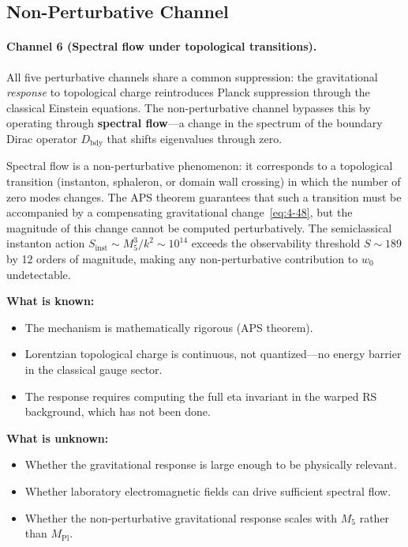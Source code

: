 \subsection{Non-Perturbative Channel}
\label{sec:4-nonperturbative}

\paragraph{Channel 6 (Spectral flow under topological transitions).}
All five perturbative channels share a common suppression: the gravitational \emph{response} to topological charge reintroduces Planck suppression through the classical Einstein equations. The non-perturbative channel bypasses this by operating through \textbf{spectral flow}---a change in the spectrum of the boundary Dirac operator $D_{\mathrm{bdy}}$ that shifts eigenvalues through zero.

Spectral flow is a non-perturbative phenomenon: it corresponds to a topological transition (instanton, sphaleron, or domain wall crossing) in which the number of zero modes changes. The APS theorem guarantees that such a transition must be accompanied by a compensating gravitational change~\eqref{eq:4-48}, but the magnitude of this change cannot be computed perturbatively. The semiclassical instanton action $S_{\mathrm{inst}} \sim M_5^3/k^2 \sim 10^{14}$ exceeds the observability threshold $S \sim 189$ by 12 orders of magnitude, making any non-perturbative contribution to $w_0$ undetectable.

\textbf{What is known:}
\begin{itemize}
  \item The mechanism is mathematically rigorous (APS theorem).
  \item Lorentzian topological charge is continuous, not quantized---no energy barrier in the classical gauge sector.
  \item The response requires computing the full eta invariant in the warped RS background, which has not been done.
\end{itemize}

\textbf{What is unknown:}
\begin{itemize}
  \item Whether the gravitational response is large enough to be physically relevant.
  \item Whether laboratory electromagnetic fields can drive sufficient spectral flow.
  \item Whether the non-perturbative gravitational response scales with $M_5$ rather than $M_{\mathrm{Pl}}$.
\end{itemize}

